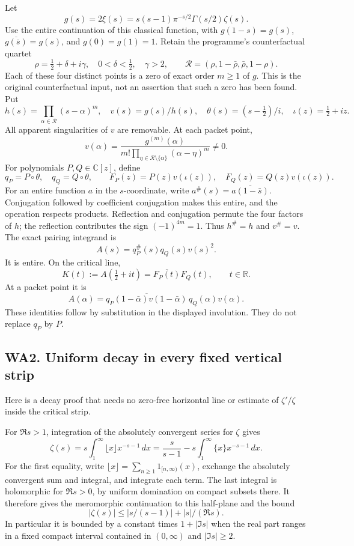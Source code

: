 \documentclass[
  10pt,
  a4paper,
]{article}
\begin{document}
Let \[
g(s)=2\xi(s)=s(s-1)\pi^{-s/2}\Gamma(s/2)\zeta(s).
\tag{WA1}
\] Use the entire continuation of this classical function, with
\(g(1-s)=g(s)\), \(\overline{g(\bar s)}=g(s)\), and \(g(0)=g(1)=1\).
Retain the programme's counterfactual quartet \[
\rho=\tfrac12+\delta+i\gamma,\quad
0<\delta<\tfrac12,\quad \gamma>2,\qquad
\mathcal R=(\rho,1-\bar\rho,\bar\rho,1-\rho).
\] Each of these four distinct points is a zero of exact order \(m\ge1\)
of \(g\). This is the original counterfactual input, not an assertion
that such a zero has been found. Put \[
h(s)=\prod_{\alpha\in\mathcal R}(s-\alpha)^m,
\quad v(s)=g(s)/h(s),\quad
\theta(s)=(s-\tfrac12)/i,\quad \iota(z)=\tfrac12+iz.
\tag{WA2}
\] All apparent singularities of \(v\) are removable. At each packet
point, \[
v(\alpha)=\frac{g^{(m)}(\alpha)}{m!\prod_{\eta\in\mathcal R\setminus\{\alpha\}}(\alpha-\eta)^m}\ne0.
\] For polynomials \(P,Q\in\mathbb C[z]\), define \[
q_P=P\circ\theta,\quad q_Q=Q\circ\theta,\qquad
F_P(z)=P(z)v(\iota(z)),\quad F_Q(z)=Q(z)v(\iota(z)).
\] For an entire function \(a\) in the \(s\)-coordinate, write
\(a^\#(s)=\overline{a(1-\bar s)}\). Conjugation followed by coefficient
conjugation makes this entire, and the operation respects products.
Reflection and conjugation permute the four factors of \(h\); the
reflection contributes the sign \((-1)^{4m}=1\). Thus \(h^\#=h\) and
\(v^\#=v\). The exact pairing integrand is \[
A(s)=q_P^\#(s)q_Q(s)v(s)^2.
\tag{WA3}
\] It is entire. On the critical line, \[
K(t):=A(\tfrac12+it)=\overline{F_P(t)}F_Q(t),\qquad t\in\mathbb R.
\tag{WA4}
\] At a packet point it is \[
A(\alpha)=\overline{q_P(1-\bar\alpha)v(1-\bar\alpha)}\,q_Q(\alpha)v(\alpha).
\tag{WA5}
\] These identities follow by substitution in the displayed involution.
They do not replace \(q_P\) by \(P\).

\subsection{WA2. Uniform decay in every fixed vertical
strip}\label{wa2.-uniform-decay-in-every-fixed-vertical-strip}

Here is a decay proof that needs no zero-free horizontal line or
estimate of \(\zeta'/\zeta\) inside the critical strip.

For \(\Re s>1\), integration of the absolutely convergent series for
\(\zeta\) gives \[
\zeta(s)=s\int_1^\infty\lfloor x\rfloor x^{-s-1}\,dx
=\frac{s}{s-1}-s\int_1^\infty\{x\}x^{-s-1}\,dx.
\tag{WA6}
\] For the first equality, write
\(\lfloor x\rfloor=\sum_{n\ge1}1_{[n,\infty)}(x)\), exchange the
absolutely convergent sum and integral, and integrate each term. The
last integral is holomorphic for \(\Re s>0\), by uniform domination on
compact subsets there. It therefore gives the meromorphic continuation
to this half-plane and the bound \[
|\zeta(s)|\le |s/(s-1)|+|s|/(\Re s).
\tag{WA7}
\] In particular it is bounded by a constant times \(1+|\Im s|\) when
the real part ranges in a fixed compact interval contained in
\((0,\infty)\) and \(|\Im s|\ge2\).
\end{document}
